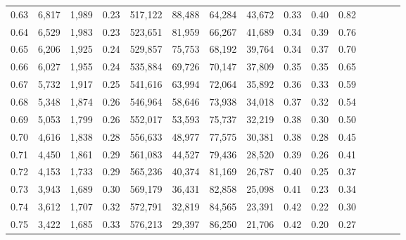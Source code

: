 \begin{tabular}{rrrcrrrrrrrrrrr}
0.63 &   6,817 &  1,989 &                                       0.23 &  517,122 &   88,488 &   64,284 &   43,672 &  0.33 &  0.40 &                         0.82 \\
0.64 &   6,529 &  1,983 &                                       0.23 &  523,651 &   81,959 &   66,267 &   41,689 &  0.34 &  0.39 &                         0.76 \\
0.65 &   6,206 &  1,925 &                                       0.24 &  529,857 &   75,753 &   68,192 &   39,764 &  0.34 &  0.37 &                         0.70 \\
0.66 &   6,027 &  1,955 &                                       0.24 &  535,884 &   69,726 &   70,147 &   37,809 &  0.35 &  0.35 &                         0.65 \\
0.67 &   5,732 &  1,917 &                                       0.25 &  541,616 &   63,994 &   72,064 &   35,892 &  0.36 &  0.33 &                         0.59 \\
0.68 &   5,348 &  1,874 &                                       0.26 &  546,964 &   58,646 &   73,938 &   34,018 &  0.37 &  0.32 &                         0.54 \\
0.69 &   5,053 &  1,799 &                                       0.26 &  552,017 &   53,593 &   75,737 &   32,219 &  0.38 &  0.30 &                         0.50 \\
0.70 &   4,616 &  1,838 &                                       0.28 &  556,633 &   48,977 &   77,575 &   30,381 &  0.38 &  0.28 &                         0.45 \\
0.71 &   4,450 &  1,861 &                                       0.29 &  561,083 &   44,527 &   79,436 &   28,520 &  0.39 &  0.26 &                         0.41 \\
0.72 &   4,153 &  1,733 &                                       0.29 &  565,236 &   40,374 &   81,169 &   26,787 &  0.40 &  0.25 &                         0.37 \\
0.73 &   3,943 &  1,689 &                                       0.30 &  569,179 &   36,431 &   82,858 &   25,098 &  0.41 &  0.23 &                         0.34 \\
0.74 &   3,612 &  1,707 &                                       0.32 &  572,791 &   32,819 &   84,565 &   23,391 &  0.42 &  0.22 &                         0.30 \\
0.75 &   3,422 &  1,685 &                                       0.33 &  576,213 &   29,397 &   86,250 &   21,706 &  0.42 &  0.20 &                         0.27 \\

\end{tabular}
